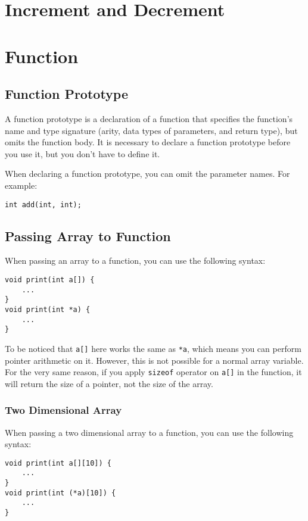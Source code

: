 \documentclass[a4paper,12pt]{article}
\begin{document}
\section{Increment and Decrement}

\section{Function}

\subsection{Function Prototype}

A function prototype is a declaration of a function that specifies the function's name and type signature (arity, data types of parameters, and return type), but omits the function body.
It is necessary to declare a function prototype before you use it, but you don't have to define it.

When declaring a function prototype, you can omit the parameter names.
For example:
\begin{verbatim}
int add(int, int);
\end{verbatim}

\subsection{Passing Array to Function}

When passing an array to a function, you can use the following syntax:
\begin{verbatim}
void print(int a[]) {
	...
}
void print(int *a) {
	...
}
\end{verbatim}

To be noticed that \texttt{a[]} here works the same as \texttt{*a}, which means you can perform pointer arithmetic on it.
However, this is not possible for a normal array variable.
For the very same reason, if you apply \texttt{sizeof} operator on \texttt{a[]} in the function, it will return the size of a pointer, not the size of the array.

\subsubsection{Two Dimensional Array}

When passing a two dimensional array to a function, you can use the following syntax:
\begin{verbatim}
void print(int a[][10]) {
	...
}
void print(int (*a)[10]) {
	...
}
\end{verbatim}
\end{document}
